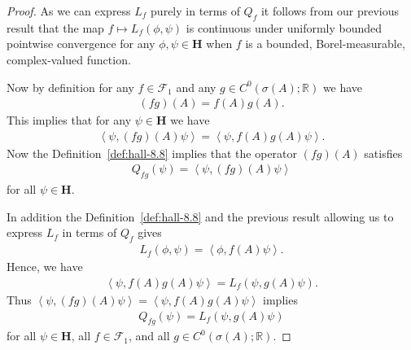 \begin{proof}
As we can express $L_f$ purely in terms of $Q_f$ it follows from our previous result that the map $f \mapsto L_f(\phi, \psi)$ is continuous under uniformly bounded pointwise convergence for any $\phi,\psi \in \mathbf{H}$ when $f$ is a bounded, Borel-measurable, complex-valued function.

Now by definition for any $f \in \mathcal{F}_1$ and any $g \in C^0(\sigma(A); \mathbb{R})$ we have
\begin{align}
    (fg)(A) = f(A)g(A).
\end{align}
This implies that for any $\psi \in \mathbf{H}$ we have
\begin{align}
    \left< \psi, (fg)(A)\psi \right> = \left< \psi, f(A)g(A)\psi \right>.
\end{align}
Now the Definition~\ref{def:hall-8.8} implies that the operator $(fg)(A)$ satisfies
\begin{align}
    Q_{fg}(\psi) = \left< \psi, (fg)(A)\psi \right>
\end{align}
for all $\psi \in \mathbf{H}$.

In addition the Definition~\ref{def:hall-8.8} and the previous result allowing us to express $L_f$ in terms of $Q_f$ gives
\begin{align}
    L_f(\phi, \psi) = \left< \phi, f(A)\psi\right>.
\end{align}
Hence, we have 
\begin{align}
    \left< \psi, f(A)g(A)\psi \right> = L_f(\psi, g(A)\psi).
\end{align}
Thus $\left< \psi, (fg)(A)\psi \right> = \left< \psi, f(A)g(A)\psi \right>$ implies
\begin{align}
    Q_{fg}(\psi) = L_f(\psi, g(A)\psi)
\end{align}
for all $\psi \in \mathbf{H}$, all $f \in \mathcal{F}_1$, and all $g \in C^0(\sigma(A); \mathbb{R})$.
\end{proof}

